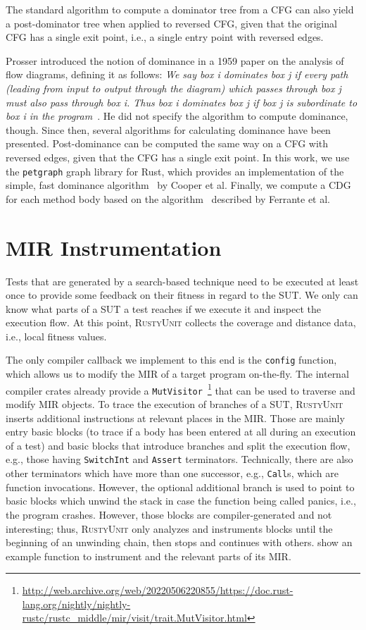 \documentclass[paper=a4,%
  twoside,%
  BCOR4mm,%
  abstract=true,%
  toc=bibliography,%
  chapterprefix=true,%
  toc=bibliographynumbered,%
  open=right,%
  english,%
  pagesize=pdftex]{scrreprt}
\newcommand{\tech}{\textsc{RustyUnit}\xspace}
\newcommand{\mir}{\ac{MIR}\xspace}
\newcommand{\cfg}{\ac{CFG}\xspace}
\newcommand{\sut}{\ac{SUT}\xspace}
\begin{document}
The standard algorithm to compute a dominator tree from a \cfg can also yield a post-dominator tree when applied to reversed \cfg, given that the original \cfg has a single exit point, i.e., a single entry point with reversed edges.

Prosser introduced the notion of dominance in a 1959 paper on the analysis of flow diagrams, defining it as follows:
\emph{We say box i dominates box j if every path (leading from input to output through the diagram) which passes through box j must also pass through box i. Thus box i dominates box j if box j is subordinate to box i in the program}~\cite{Prosser1959}. He did not specify the algorithm to compute dominance, though. Since then, several algorithms for calculating dominance have been presented. Post-dominance can be computed the same way on a \cfg with reversed edges, given that the \cfg has a single exit point. In this work, we use the \texttt{petgraph} graph library for Rust, which provides an implementation of the simple, fast dominance algorithm~\cite{Cooper2001} by Cooper et al. Finally, we compute a \ac{CDG} for each method body based on the algorithm~\cite{Ferrante1987} described by Ferrante et al.

\section{MIR Instrumentation}
Tests that are generated by a search-based technique need to be executed at least once to provide some feedback on their fitness in regard to the \sut. We only can know what parts of a \sut a test reaches if we execute it and inspect the execution flow. At this point, \tech collects the coverage and distance data, i.e., local fitness values.

The only compiler callback we implement to this end is the \texttt{config} function, which allows us to modify the \mir of a target program on-the-fly. The internal compiler crates already provide a \texttt{MutVisitor}~\footnote{\url{http://web.archive.org/web/20220506220855/https://doc.rust-lang.org/nightly/nightly-rustc/rustc_middle/mir/visit/trait.MutVisitor.html}} that can be used to traverse and modify \mir objects. To trace the execution of branches of a \sut, \tech inserts additional instructions at relevant places in the \mir. Those are mainly entry basic blocks (to trace if a body has been entered at all during an execution of a test) and basic blocks that introduce branches and split the execution flow, e.g., those having \texttt{SwitchInt} and \texttt{Assert} terminators. Technically, there are also other terminators which have more than one successor, e.g., \texttt{Call}s, which are function invocations. However, the optional additional branch is used to point to basic blocks which unwind the stack in case the function being called panics, i.e., the program crashes. However, those blocks are compiler-generated and not interesting; thus, \tech only analyzes and instruments blocks until the beginning of an unwinding chain, then stops and continues with others.  show an example function to instrument and the relevant parts of its \mir.
\end{document}
